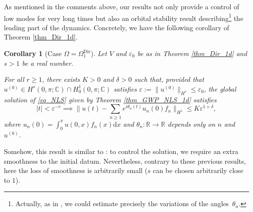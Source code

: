\documentclass[JEP,XML,SOM,Unicode,NoEqCountersInSection,published]{cedram}
\let\epsilon\varepsilon
\newtheorem{corollary}[theorem]{Corollary}
\theoremstyle{definition}
\begin{document}
As mentioned in the comments above, our results not only provide a control of low modes for very long times but also an orbital stability result describing\footnote{Actually, as in \cite[Th.\,1]{KtA}, we could estimate precisely the variations of the angles~$\theta_n$.} the leading part of the dynamics. Concretely, we have the following corollary of Theorem \ref{thm_Dir_1d}.
\begin{corollary}[Case $\Omega = \Omega^{\mathrm{Dir}}_1$] \label{cor_whaou}
Let $V$ and $\epsilon_0$ be as in Theorem \ref{thm_Dir_1d} and $s> 1$ be a real number.

For all $r\geq 1$, there exists $K>0$ and $\delta >0$ such that, provided that $u^{(0)}\in H^s(0,\pi;\mathbb{C}) \cap H^1_0(0,\pi;\mathbb{C})$ satisfies $\varepsilon:= \| u^{(0)} \|_{H^s} \leq \epsilon_0$, the global solution of \eqref{eq_NLS} given by Theorem \ref{thm_GWP_NLS_1d} satisfies
\[
|t|< \varepsilon^{-r} \implies \biggl\| u(t) - \sum_{n\geq 1} e^{i\theta_n(t)} u_n(0) f_n \biggr\|_{H^1} \leq K \varepsilon^{1+\delta},
\]
where $u_n(0) = \int_0^\pi u(0,x) f_n(x) \mathrm{d}x$ and $\theta_n: \mathbb{R} \to \mathbb{R}$ depends only on $n$ and $u^{(0)}$.
\end{corollary}
Somehow, this result is similar to \cite{Bou96,BFG20b}: to control the solution, we require an extra smoothness to the initial datum. Nevertheless, contrary to these previous results, here the loss of smoothness is arbitrarily small (\ie $s$ can be chosen arbitrarily close to $1$).
\end{document}
